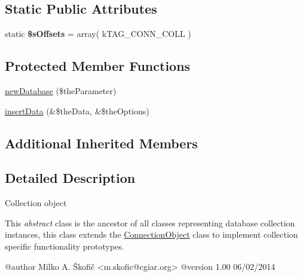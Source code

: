 \subsection*{Static Public Attributes}
\begin{DoxyCompactItemize}
\item 
\hypertarget{class_ontology_wrapper_1_1_collection_object_a27abf14ffa8185f0fb69b6166869ffd9}{static {\bfseries \$s\-Offsets} = array( k\-T\-A\-G\-\_\-\-C\-O\-N\-N\-\_\-\-C\-O\-L\-L )}\label{class_ontology_wrapper_1_1_collection_object_a27abf14ffa8185f0fb69b6166869ffd9}

\end{DoxyCompactItemize}
\subsection*{Protected Member Functions}
\begin{DoxyCompactItemize}
\item 
\hyperlink{class_ontology_wrapper_1_1_collection_object_a32ad8e11098caeae5498b5bc5ec74b80}{new\-Database} (\$the\-Parameter)
\item 
\hyperlink{class_ontology_wrapper_1_1_collection_object_adc48ee44a9d36d23a9db87a8ab4e4eff}{insert\-Data} (\&\$the\-Data, \&\$the\-Options)
\end{DoxyCompactItemize}
\subsection*{Additional Inherited Members}


\subsection{Detailed Description}
Collection object

This {\itshape abstract} class is the ancestor of all classes representing database collection instances, this class extends the \hyperlink{class_ontology_wrapper_1_1_connection_object}{Connection\-Object} class to implement collection specific functionality prototypes. \begin{DoxyVerb} @author            Milko A. Škofič <m.skofic@cgiar.org>
 @version   1.00 06/02/2014\end{DoxyVerb}
 

